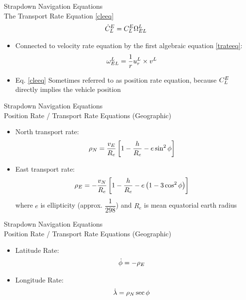 \begin{frame}
\end{frame}
\begin{frame}
Strapdown Navigation Equations\\
The Transport Rate Equation \eqref{cleeq}
\[\dot{C}_L^E=C_L^E\Omega_{EL}^L\]
\begin{itemize}
  \item Connected to velocity rate equation by the first algebraic equation \eqref{trateeq}:
\[\omega_{EL}^L=\dfrac{1}{r}u_r^L\times v^L\]
  \item Eq. \eqref{cleeq} Sometimes referred to as position rate equation, because $C_{L}^{E}$ directly implies the vehicle position
\end{itemize} 
\end{frame}

\begin{frame}
Strapdown Navigation Equations\\
Position Rate / Transport Rate Equations (Geographic)
\begin{itemize}
  \item North transport rate:
\begin{equation}\label{trateneq}
\rho_N=\dfrac{v_E}{R_e}\left[1-\dfrac{h}{R_e}-e\sin^2\phi\right]
\end{equation} 
  \item East transport rate:
\begin{equation}\label{trateeeq}
\rho_E=-\dfrac{v_N}{R_e}\left[1-\dfrac{h}{R_e}-e\left(1-3\cos^2 \phi\right)\right]
\end{equation} 
where $e$ is ellipticity (approx. $\dfrac{1}{298}$) and $R_e$ is mean equatorial earth radius
\end{itemize} 
\end{frame}

\begin{frame}
Strapdown Navigation Equations\\
Position Rate / Transport Rate Equations (Geographic)
\begin{itemize}
  \item Latitude Rate:
\begin{equation}\label{latrate}
\dot{\phi}=-\rho_E
\end{equation}  
  \item Longitude Rate:
\begin{equation}\label{lonrate}
\dot{\lambda}=\rho_N \sec\phi
\end{equation}  
\end{itemize} 
\end{frame}

